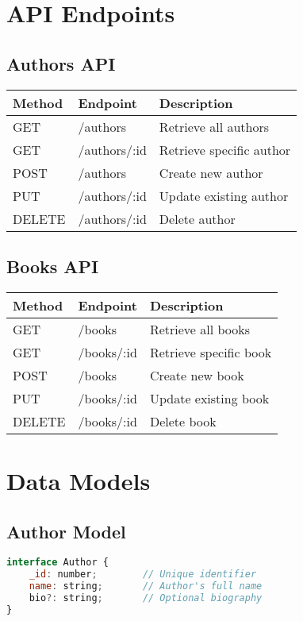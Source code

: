 \documentclass[11pt,a4paper]{article}
\begin{document}
\section{API Endpoints}

\subsection{Authors API}
\begin{center}
\begin{tabular}{|l|l|l|}
\hline
\textbf{Method} & \textbf{Endpoint} & \textbf{Description} \\
\hline
GET & /authors & Retrieve all authors \\
GET & /authors/:id & Retrieve specific author \\
POST & /authors & Create new author \\
PUT & /authors/:id & Update existing author \\
DELETE & /authors/:id & Delete author \\
\hline
\end{tabular}
\end{center}

\subsection{Books API}
\begin{center}
\begin{tabular}{|l|l|l|}
\hline
\textbf{Method} & \textbf{Endpoint} & \textbf{Description} \\
\hline
GET & /books & Retrieve all books \\
GET & /books/:id & Retrieve specific book \\
POST & /books & Create new book \\
PUT & /books/:id & Update existing book \\
DELETE & /books/:id & Delete book \\
\hline
\end{tabular}
\end{center}

\section{Data Models}

\subsection{Author Model}
\begin{lstlisting}[language=JavaScript, caption=Author Interface]
interface Author {
    _id: number;        // Unique identifier
    name: string;       // Author's full name
    bio?: string;       // Optional biography
}
\end{lstlisting}
\end{document}
